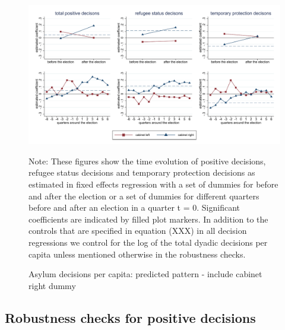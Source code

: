 \documentclass[11pt,a4paper]{scrartcl}
\begin{document}



\clearpage
\FloatBarrier
\begin{figure}[!ht]
	
	\caption{Asylum decisions per capita: predicted pattern - include cabinet right dummy}
	\centering
	\begin{minipage}{0.9\textwidth} 
		\includegraphics[width=\linewidth]{../results/decisions/dec_graphs_cabinet_right.pdf}
		{\scriptsize Note: These figures show the time evolution of positive decisions, refugee status decisions and temporary protection decisions as estimated in fixed effects regression with a set of dummies for before and after the election or a set of dummies for different quarters before and after an election in a quarter t = 0. Significant coefficients are indicated by filled plot markers. In addition to the controls that are specified in equation (XXX) in all decision regressions we control for the log of the total dyadic decisions per capita unless mentioned otherwise in the robustness checks.\par}
	\end{minipage}
\end{figure}





\clearpage
\FloatBarrier
\subsection{Robustness checks for positive decisions}


\end{document}
